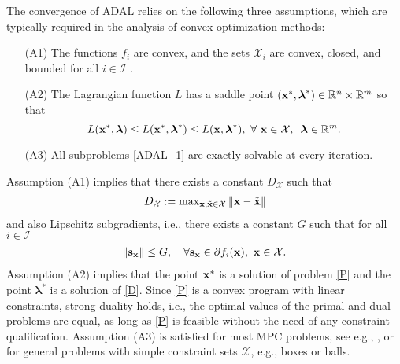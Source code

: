 \documentclass[doublecolumn]{IEEEtran}
\begin{document}
The convergence of ADAL relies on the following three assumptions, which are typically required in the analysis of convex optimization methods:
\begin{itemize}
\item[(A1)] The functions  $f_i$ are convex, and the sets $\mathcal{X}_i$ are convex, closed, and bounded for all $i\in\mathcal{I}$ .
\item[(A2)]
The Lagrangian function $L$ has a saddle point $({ {\bf x} }^*,{\boldsymbol{\lambda}}^*)\in {\mathbb R}^n\times{\mathbb R}^m$ so that
\begin{equation*}
L({ {\bf x} }^*,{\boldsymbol{\lambda}})\leq L({ {\bf x} }^*,{\boldsymbol{\lambda}}^*)\leq L({ {\bf x} },{\boldsymbol{\lambda}}^*),~ \forall  ~{ {\bf x} }\in { \mathcal{X} },\,~ {\boldsymbol{\lambda}}\in{\mathbb R}^m.
\end{equation*}
\item[(A3)] All subproblems \eqref{ADAL_1} are exactly solvable at every iteration.
\end{itemize}

Assumption (A1) implies that there exists a constant $D_{ \mathcal{X} }$ such that
\begin{align}\label{eqn:DX}
D_{ \mathcal{X} } := \max\nolimits_{{ {\bf x} },{ \tilde{\bf x} } \in { \mathcal{X} }} \|{ {\bf x} }-{ \tilde{\bf x} }\|
\end{align}
and also Lipschitz subgradients, i.e., there exists a constant $G$ such that for all $i \in { \mathcal{I} }$
\begin{align}\label{eqn:G}
\|{\mathbf{s}}_{ {\bf x} }\| \le G, \quad \forall {\mathbf{s}}_{ {\bf x} } \in \partial f_i({ {\bf x} }),~ { {\bf x} } \in { \mathcal{X} }.
\end{align}
Assumption (A2) implies that the point ${ {\bf x} }^*$ is a solution of problem \eqref{P} and the point ${\boldsymbol{\lambda}}^*$ is a solution of \eqref{D}.
Since \eqref{P} is a convex program with linear constraints,
strong duality holds, i.e., the optimal values of the primal and dual problems are equal, as long as \eqref{P} is feasible without the need of any constraint qualification.
Assumption (A3) is satisfied for most MPC problems, see e.g., \cite[Section V]{RichterConf},
or for general problems with simple constraint sets ${ \mathcal{X} }$, e.g., boxes or balls.
\end{document}
